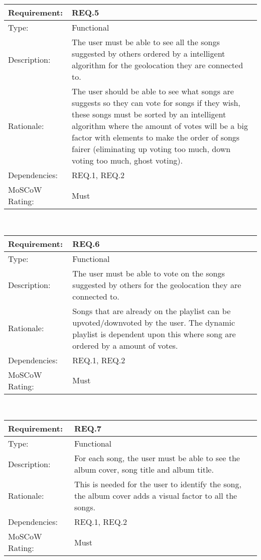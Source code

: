 \vspace{0.5cm}

\noindent
\begin{tabular}{|l || p{12.0cm}|}
  \hline
  Requirement:       & REQ.5 \\ \hline
  Type:              & Functional \\ \hline
  Description:       & The user must be able to see all the songs suggested by others ordered by a intelligent algorithm for the geolocation they are connected to.\\ \hline
  Rationale:         & The user should be able to see what songs are suggests so they can vote for songs if they wish, these songs must be sorted by an intelligent algorithm where the amount of votes will be a big factor with elements to make the order of songs fairer (eliminating up voting too much, down voting too much, ghost voting). \\ \hline
  Dependencies:      & REQ.1, REQ.2 \\ \hline
  MoSCoW Rating:     & Must \\
\hline
\end{tabular}\\

\vspace{0.5cm}

\noindent
\begin{tabular}{|l || p{12.0cm}|}
  \hline
  Requirement:       & REQ.6 \\ \hline
  Type:              & Functional \\ \hline
  Description:       & The user must be able to vote on the songs suggested by others for the geolocation they are connected to. \\ \hline
  Rationale:         & Songs that are already on the playlist can be upvoted/downvoted by the user. The dynamic playlist is dependent upon this where song are ordered by a amount of votes. \\ \hline
  Dependencies:      & REQ.1, REQ.2 \\ \hline
  MoSCoW Rating:     & Must \\
\hline
\end{tabular}\\

\vspace{0.5cm}

\noindent
\begin{tabular}{|l || p{12.0cm}|}
  \hline
  Requirement:       & REQ.7 \\ \hline
  Type:              & Functional \\ \hline
  Description:       & For each song, the user must be able to see the album cover, song title and album title. \\ \hline
  Rationale:         & This is needed for the user to identify the song, the album cover adds a visual factor to all the songs. \\ \hline
  Dependencies:      & REQ.1, REQ.2 \\ \hline
  MoSCoW Rating:     & Must \\
\hline
\end{tabular}\\

